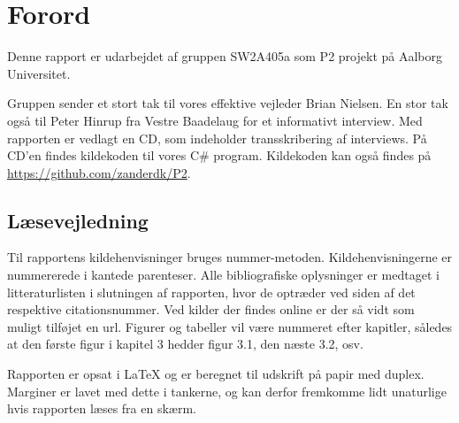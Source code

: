 \chapter*{Forord}
Denne rapport er udarbejdet af gruppen SW2A405a som P2 projekt på Aalborg Universitet.


Gruppen sender et stort tak til vores effektive vejleder Brian Nielsen.
En stor tak også til Peter Hinrup fra Vestre Baadelaug for et informativt interview.
Med rapporten er vedlagt en CD, som indeholder transskribering af interviews. På CD'en findes kildekoden til vores C\# program. Kildekoden kan også findes på \url{https://github.com/zanderdk/P2}.


\section{Læsevejledning}
Til rapportens kildehenvisninger bruges nummer-metoden. Kildehenvisningerne er nummererede i kantede parenteser. Alle bibliografiske oplysninger er medtaget i litteraturlisten i slutningen af rapporten, hvor de optræder ved siden af det respektive citationsnummer. Ved kilder der findes online er der så vidt som muligt tilføjet en url. Figurer og tabeller vil være nummeret efter kapitler, således at den første figur i kapitel 3 hedder figur 3.1, den næste 3.2, osv.	

Rapporten er opsat i \LaTeX{} og er beregnet til udskrift på papir med duplex. Marginer er lavet med dette i tankerne, og kan derfor fremkomme lidt unaturlige hvis rapporten læses fra en skærm.
